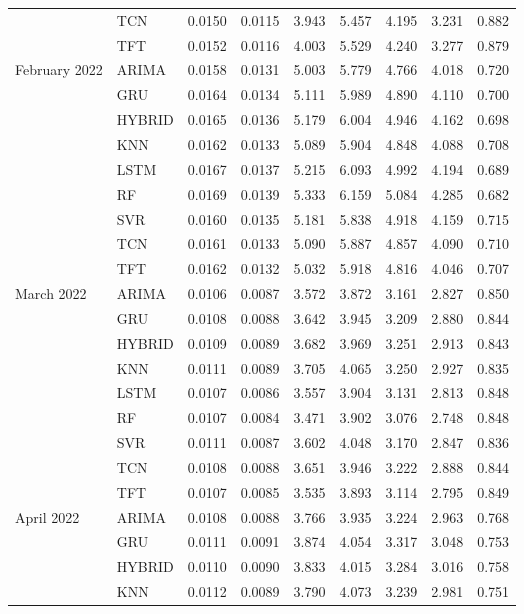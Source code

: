 \begin{tabular}{lllllllll}
 & TCN & 0.0150 & 0.0115 & 3.943 & 5.457 & 4.195 & 3.231 & 0.882 \\
 & TFT & 0.0152 & 0.0116 & 4.003 & 5.529 & 4.240 & 3.277 & 0.879 \\
February 2022 & ARIMA & 0.0158 & 0.0131 & 5.003 & 5.779 & 4.766 & 4.018 & 0.720 \\
 & GRU & 0.0164 & 0.0134 & 5.111 & 5.989 & 4.890 & 4.110 & 0.700 \\
 & HYBRID & 0.0165 & 0.0136 & 5.179 & 6.004 & 4.946 & 4.162 & 0.698 \\
 & KNN & 0.0162 & 0.0133 & 5.089 & 5.904 & 4.848 & 4.088 & 0.708 \\
 & LSTM & 0.0167 & 0.0137 & 5.215 & 6.093 & 4.992 & 4.194 & 0.689 \\
 & RF & 0.0169 & 0.0139 & 5.333 & 6.159 & 5.084 & 4.285 & 0.682 \\
 & SVR & 0.0160 & 0.0135 & 5.181 & 5.838 & 4.918 & 4.159 & 0.715 \\
 & TCN & 0.0161 & 0.0133 & 5.090 & 5.887 & 4.857 & 4.090 & 0.710 \\
 & TFT & 0.0162 & 0.0132 & 5.032 & 5.918 & 4.816 & 4.046 & 0.707 \\
March 2022 & ARIMA & 0.0106 & 0.0087 & 3.572 & 3.872 & 3.161 & 2.827 & 0.850 \\
 & GRU & 0.0108 & 0.0088 & 3.642 & 3.945 & 3.209 & 2.880 & 0.844 \\
 & HYBRID & 0.0109 & 0.0089 & 3.682 & 3.969 & 3.251 & 2.913 & 0.843 \\
 & KNN & 0.0111 & 0.0089 & 3.705 & 4.065 & 3.250 & 2.927 & 0.835 \\
 & LSTM & 0.0107 & 0.0086 & 3.557 & 3.904 & 3.131 & 2.813 & 0.848 \\
 & RF & 0.0107 & 0.0084 & 3.471 & 3.902 & 3.076 & 2.748 & 0.848 \\
 & SVR & 0.0111 & 0.0087 & 3.602 & 4.048 & 3.170 & 2.847 & 0.836 \\
 & TCN & 0.0108 & 0.0088 & 3.651 & 3.946 & 3.222 & 2.888 & 0.844 \\
 & TFT & 0.0107 & 0.0085 & 3.535 & 3.893 & 3.114 & 2.795 & 0.849 \\
April 2022 & ARIMA & 0.0108 & 0.0088 & 3.766 & 3.935 & 3.224 & 2.963 & 0.768 \\
 & GRU & 0.0111 & 0.0091 & 3.874 & 4.054 & 3.317 & 3.048 & 0.753 \\
 & HYBRID & 0.0110 & 0.0090 & 3.833 & 4.015 & 3.284 & 3.016 & 0.758 \\
 & KNN & 0.0112 & 0.0089 & 3.790 & 4.073 & 3.239 & 2.981 & 0.751 \\

\end{tabular}
